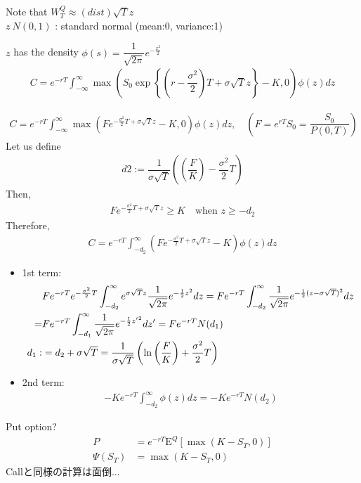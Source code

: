 \documentclass[a4paper,11pt]{jsarticle}
\theoremstyle{definition}
\newcommand{\df}[2]{\dfrac{#1}{#2}}
\newcommand{\intinf}{\int_{-\infty}^{\infty}}
\begin{document}
Note that $W_T^Q \approx(dist) \sqrt{T}z$ \\
$z~N(0,1)$ : standard normal (mean:0, variance:1)

$z$ has the density $\phi(s)=\df{1}{\sqrt{2\pi}}
e^{-\frac{x^2}{2}}$
\begin{align}
  C=e^{-rT}\intinf \max\left(S_0 \exp\left\{
  \left(r-\df{\sigma^2}{2}\right)T+\sigma\sqrt{T}z\right\}
  -K,0\right)\phi(z)dz
\end{align}

\begin{align}
  C=e^{-rT}\intinf \max\left(Fe^{-\frac{\sigma^2}{2}T
  +\sigma\sqrt{T}z}-K,0 \right)\phi(z)dz,
  \quad (F=e^{rT}S_0=\df{S_0}{P(0,T)})
\end{align}
Let us define
\begin{align}
  d2:=\df{1}{\sigma\sqrt{T}}\left(\left(\df{F}{K}\right)
  -\df{\sigma^2}{2}T\right)
\end{align}
Then,
\begin{align}
  Fe^{-\frac{\sigma^2}{2}T+\sigma\sqrt{T}z}\geq K
  \quad \mbox{when } z\geq -d_2
\end{align}
Therefore,
\begin{align}
  C=e^{-rT}\int_{-d_2}^{\infty} \left(
  Fe^{-\frac{\sigma^2}{2}T+\sigma\sqrt{T}z}-K\right)\phi(z)dz
\end{align}

\begin{itemize}
  \item 1st term:
  \begin{align}
    &Fe^{-rT}e^{-\frac{\sigma^2}{2}T}
    \int_{-d_2}^{\infty}e^{\sigma\sqrt{T}z}
    \df{1}{\sqrt{2\pi}}e^{-\frac{1}{2}z^2}dz
    =Fe^{-rT}\int_{-d_2}^{\infty}
    \df{1}{\sqrt{2\pi}}e^{-\frac{1}{2}(z-\sigma\sqrt{T})^2}dz
    \notag\\
    =&Fe^{-rT}\int_{-d_1}^{\infty}
    \df{1}{\sqrt{2\pi}}e^{-\frac{1}{2}{z'}^2}dz'
    =Fe^{-rT}N(d_1) \\
    d_1 :&=d_2+\sigma\sqrt{T}=\df{1}{\sigma\sqrt{T}}
    \left(\ln\left(\df{F}{K}\right)+\df{\sigma^2}{2}T\right)
  \end{align}
  \item 2nd term:
  \begin{align}
    -Ke^{-rT}\int_{-d_2}^{\infty}\phi(z)dz
    =-Ke^{-rT}N(d_2)
  \end{align}
\end{itemize}



Put option?
\begin{align}
  P&=e^{-rT}\mathrm{E}^Q[\max(K-S_T,0)] \\
  \Psi(S_T)&=\max(K-S_T,0)
\end{align}
Callと同様の計算は面倒...
\end{document}
